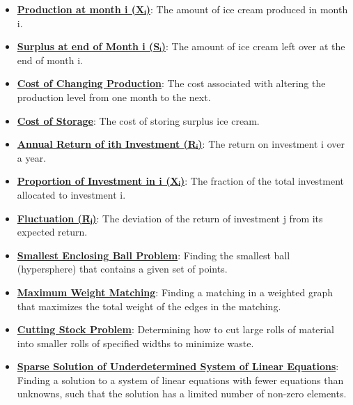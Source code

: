 \documentclass{article}%
\begin{document}
\begin{itemize}[leftmargin=*]
\item \href{https://www.math.purdue.edu/~yipn/421/2024-10-28-ApplsLinProg.pdf#page=3}{\textbf{Production at month i (Xᵢ)}}: The amount of ice cream produced in month i.%
\item \href{https://www.math.purdue.edu/~yipn/421/2024-10-28-ApplsLinProg.pdf#page=3}{\textbf{Surplus at end of Month i (Sᵢ)}}: The amount of ice cream left over at the end of month i.%
\item \href{https://www.math.purdue.edu/~yipn/421/2024-10-28-ApplsLinProg.pdf#page=3}{\textbf{Cost of Changing Production}}: The cost associated with altering the production level from one month to the next.%
\item \href{https://www.math.purdue.edu/~yipn/421/2024-10-28-ApplsLinProg.pdf#page=3}{\textbf{Cost of Storage}}: The cost of storing surplus ice cream.%
\item \href{https://www.math.purdue.edu/~yipn/421/2024-10-28-ApplsLinProg.pdf#page=9}{\textbf{Annual Return of ith Investment (Rᵢ)}}: The return on investment i over a year.%
\item \href{https://www.math.purdue.edu/~yipn/421/2024-10-28-ApplsLinProg.pdf#page=9}{\textbf{Proportion of Investment in i (Xᵢ)}}: The fraction of the total investment allocated to investment i.%
\item \href{https://www.math.purdue.edu/~yipn/421/2024-10-28-ApplsLinProg.pdf#page=10}{\textbf{Fluctuation (R̃ⱼ)}}: The deviation of the return of investment j from its expected return.%
\item \href{https://www.math.purdue.edu/~yipn/421/2024-10-28-ApplsLinProg.pdf#page=17}{\textbf{Smallest Enclosing Ball Problem}}: Finding the smallest ball (hypersphere) that contains a given set of points.%
\item \href{https://www.math.purdue.edu/~yipn/421/2024-10-28-ApplsLinProg.pdf#page=19}{\textbf{Maximum Weight Matching}}: Finding a matching in a weighted graph that maximizes the total weight of the edges in the matching.%
\item \href{https://www.math.purdue.edu/~yipn/421/2024-10-28-ApplsLinProg.pdf#page=25}{\textbf{Cutting Stock Problem}}: Determining how to cut large rolls of material into smaller rolls of specified widths to minimize waste.%
\item \href{https://www.math.purdue.edu/~yipn/421/2024-10-28-ApplsLinProg.pdf#page=30}{\textbf{Sparse Solution of Underdetermined System of Linear Equations}}: Finding a solution to a system of linear equations with fewer equations than unknowns, such that the solution has a limited number of non-zero elements.%

\end{itemize}
\end{document}
